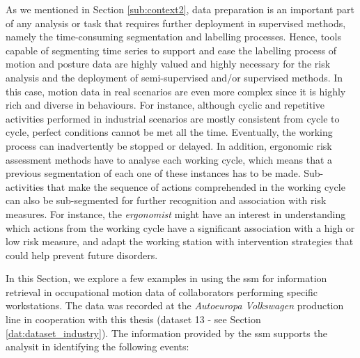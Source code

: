As we mentioned in Section \ref{sub:context2}, data preparation is an important part of any analysis or task that requires further deployment in supervised methods, namely the time-consuming segmentation and labelling processes. Hence, tools capable of segmenting time series to support and ease the labelling process of motion and posture data are highly valued and highly necessary for the risk analysis and the deployment of semi-supervised and/or supervised methods. In this case, motion data in real scenarios are even more complex since it is highly rich and diverse in behaviours. For instance, although cyclic and repetitive activities performed in industrial scenarios are mostly consistent from cycle to cycle, perfect conditions cannot be met all the time. Eventually, the working process can inadvertently be stopped or delayed. In addition, ergonomic risk assessment methods have to analyse each working cycle, which means that a previous segmentation of each one of these instances has to be made. Sub-activities that make the sequence of actions comprehended in the working cycle can also be sub-segmented for further recognition and association with risk measures. For instance, the \textit{ergonomist} might have an interest in understanding which actions from the working cycle have a significant association with a high or low risk measure, and adapt the working station with intervention strategies that could help prevent future disorders. 

In this Section, we explore a few examples in using the \gls{ssm} for information retrieval in occupational motion data of collaborators performing specific workstations. The data was recorded at the \textit{Autoeuropa Volkswagen} production line in cooperation with this thesis (dataset 13 - see Section \ref{dat:dataset_industry}). The information provided by the \gls{ssm} supports the analysit in identifying the following events: 

